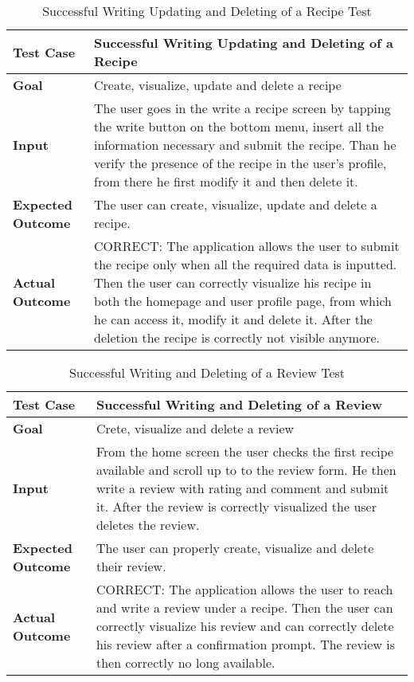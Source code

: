 \begin{table}[H]
	\centering
	\begin{tabular}{|l|l|}
		\hline
		\textbf{Test Case}& Successful Writing Updating and Deleting of a Recipe\\
		\hline
		\textbf{Goal}&Create, visualize, update and delete a recipe\\
		\hline
		\textbf{Input}& 
		\begin{minipage}{.7\linewidth}
			The user goes in the write a recipe screen by tapping the write button on the bottom menu, insert all the information necessary and submit the recipe. Than he verify the presence of the recipe in the user's profile, from there he first modify it and then delete it.
		\end{minipage}\\
		\hline
		\textbf{Expected Outcome}& The user can create, visualize, update and delete a recipe.\\
		\hline
		\textbf{Actual Outcome}& 
		\begin{minipage}{.7\linewidth}
			CORRECT: The application allows the user to submit the recipe only when all the required data is inputted. Then the user can correctly visualize his recipe in both the homepage and user profile page, from which he can access it, modify it and delete it. After the deletion the recipe is correctly not visible anymore.
		\end{minipage}\\
		\hline	
	\end{tabular}
	\caption{Successful Writing Updating and Deleting of a Recipe Test}
\end{table}

\begin{table}[H]
	\centering
	\begin{tabular}{|l|l|}
		\hline
		\textbf{Test Case}& Successful Writing and Deleting of a Review\\
		\hline
		\textbf{Goal}& Crete, visualize and delete a review\\
		\hline
		\textbf{Input}& 
		\begin{minipage}{.7\linewidth}
			From the home screen the user checks the first recipe available and scroll up to to the review form. He then write a review with rating and comment and submit it. After the review is correctly visualized the user deletes the review.
		\end{minipage}\\
		\hline
		\textbf{Expected Outcome}& The user can properly create, visualize and delete their review.\\
		\hline
		\textbf{Actual Outcome}& 
		\begin{minipage}{.7\linewidth}
			CORRECT: The application allows the user to reach and write a review under a recipe. Then the user can correctly visualize his review and can correctly delete his review after a confirmation prompt. The review is then correctly no long available.
		\end{minipage}\\
		\hline	
	\end{tabular}
	\caption{Successful Writing and Deleting of a Review Test}
\end{table}

